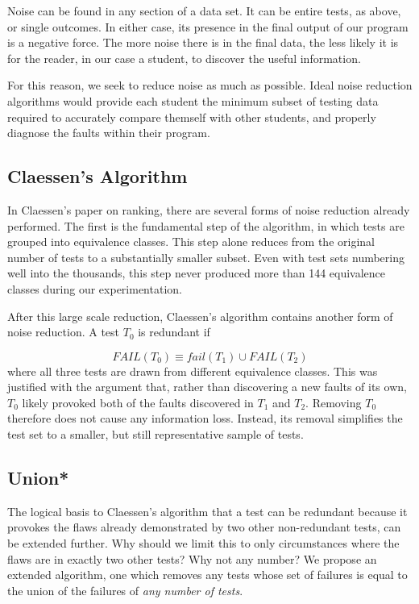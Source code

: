 \documentclass[11pt,twoside]{article}
\newcommand\fail{\mathit{FAIL}}
\let\cite=\citep
\begin{document}
Noise can be found in any section of a data set. It can be entire tests, as above, or single outcomes. In either case, its presence in the final output of our program is a negative force. The more noise there is in the final data, the less likely it is for the reader, in our case a student, to discover the useful information.

For this reason, we seek to reduce noise as much as possible. Ideal noise reduction algorithms would provide each student the minimum subset of testing data required to accurately compare themself with other students, and properly diagnose the faults within their program.


\subsection{Claessen's Algorithm}
In Claessen's paper on ranking, there are several forms of noise reduction already performed. The first is the fundamental step of the algorithm, in which tests are grouped into equivalence classes. This step alone reduces from the original number of tests to a substantially smaller subset. Even with test sets numbering well into the thousands, this step never produced more than 144 equivalence classes during our experimentation.

After this large scale reduction, Claessen's algorithm contains another form of noise reduction. A test $T_0$ is redundant if

$$\fail (T_0) \equiv fail(T_1) \cup \fail(T_2)$$
where all three tests are drawn from different equivalence classes. This was justified with the argument that, rather than discovering a new faults of its own, $T_0$ likely provoked both of the faults discovered in $T_1$ and $T_2$. Removing $T_0$ therefore does not cause any information loss. Instead, its removal simplifies the test set to a smaller, but still representative sample of tests.

\subsection{Union*}
The logical basis to Claessen's algorithm that a test can be redundant because it provokes the flaws already demonstrated by two other non-redundant tests\cite{Claessen}, can be extended further. Why should we limit this to only circumstances where the flaws are in exactly two other tests? Why not any number? We propose an extended algorithm, one which removes any tests whose set of failures is equal to the union of the failures of \emph{any number of tests}. 
\end{document}
